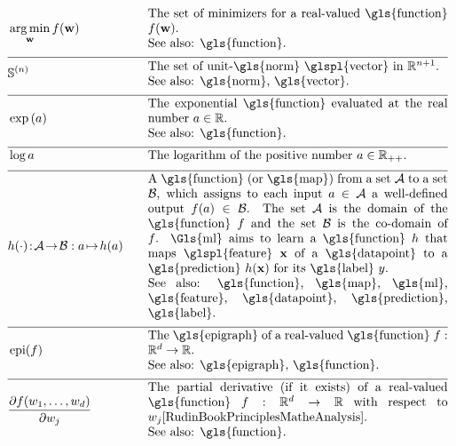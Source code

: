 \newpage
\begin{align}
    	&\aargmin_{\weights} f(\weights) &\quad &\parbox{.70\textwidth}{The set of minimizers for a real-valued \gls{function} $f(\weights)$. 
    		\\ See also: \gls{function}. } \nonumber \\[2mm] \hline \nonumber\\[-5mm]
    	&\sphere{\nrnodes} &\quad &\parbox{.70\textwidth}{The set of unit-\gls{norm} \glspl{vector} in $\mathbb{R}^{\nrnodes+1}$.
    		\\ See also: \gls{norm}, \gls{vector}. }\nonumber \\[2mm] \hline \nonumber\\[-5mm]
	&\exp\,(a) &\quad &\parbox{.70\textwidth}{The exponential \gls{function} evaluated at the real number $a \in \mathbb{R}$.
		\\ See also: \gls{function}. } \nonumber \\[2mm] \hline \nonumber\\[-5mm]
	&\log a &\quad &\mbox{The logarithm of the positive number $a \in \mathbb{R}_{++}$.  } \nonumber \\[2mm] \hline \nonumber\\[-5mm]
	&\hypothesis(\cdot)\!:\!\mathcal{A}\!\rightarrow\!\mathcal{B} :  a \!\mapsto\!h(a) &\quad &\parbox{.70\textwidth}{
	 	A \gls{function} (or \gls{map}) from a set $\mathcal{A}$ to a set $\mathcal{B}$, which assigns to each input 
	 	$a \in \mathcal{A}$ a well-defined output $f(a) \in \mathcal{B}$.
	 	The set $\mathcal{A}$ is the domain of the \gls{function} $f$ and the set $\mathcal{B}$ is the 
	 	co-domain of $f$. \Gls{ml} aims to learn a \gls{function} $\hypothesis$ that maps \glspl{feature} 
	 	$\featurevec$ of a \gls{datapoint} to a \gls{prediction} $\hypothesis(\featurevec)$ for its \gls{label} $\truelabel$.
		\\ See also: \gls{function}, \gls{map}, \gls{ml}, \gls{feature}, \gls{datapoint}, \gls{prediction}, \gls{label}.} \nonumber \\[2mm] \hline \nonumber\\[-5mm]
	&\operatorname{epi}(f)  & \quad & \parbox{.70\textwidth}{The \gls{epigraph} of a real-valued \gls{function} 
	 	$f: \mathbb{R}^{\featuredim}\rightarrow \mathbb{R}$.
		\\ See also: \gls{epigraph}, \gls{function}. } \nonumber \\[2mm]  \hline \nonumber\\[-5mm]
	&  \frac{\partial f(\weight_{1}, \ldots, \weight_{\nrfeatures})}{\partial \weight_{\featureidx}} & \quad & \parbox{.70\textwidth}{The partial derivative 
		(if it exists) of a real-valued \gls{function} $f: \mathbb{R}^{\featuredim}\rightarrow \mathbb{R}$ with respect 
		to\ $\weight_{\featureidx}$\cite[Ch. 9]{RudinBookPrinciplesMatheAnalysis}.
		\\ See also: \gls{function}. } \nonumber 
\end{align} 

